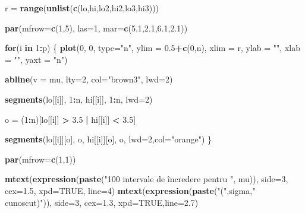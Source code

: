 \documentclass[]{article}
\newenvironment{Shaded}{\begin{snugshade}}{\end{snugshade}}
\newcommand{\KeywordTok}[1]{\textcolor[rgb]{0.13,0.29,0.53}{\textbf{#1}}}
\newcommand{\DataTypeTok}[1]{\textcolor[rgb]{0.13,0.29,0.53}{#1}}
\newcommand{\DecValTok}[1]{\textcolor[rgb]{0.00,0.00,0.81}{#1}}
\newcommand{\FloatTok}[1]{\textcolor[rgb]{0.00,0.00,0.81}{#1}}
\newcommand{\StringTok}[1]{\textcolor[rgb]{0.31,0.60,0.02}{#1}}
\newcommand{\OtherTok}[1]{\textcolor[rgb]{0.56,0.35,0.01}{#1}}
\newcommand{\ControlFlowTok}[1]{\textcolor[rgb]{0.13,0.29,0.53}{\textbf{#1}}}
\newcommand{\OperatorTok}[1]{\textcolor[rgb]{0.81,0.36,0.00}{\textbf{#1}}}
\newcommand{\NormalTok}[1]{#1}
\begin{document}
\begin{Shaded}
\begin{Highlighting}[]
\NormalTok{r =}\StringTok{ }\KeywordTok{range}\NormalTok{(}\KeywordTok{unlist}\NormalTok{(}\KeywordTok{c}\NormalTok{(lo,hi,lo2,hi2,lo3,hi3)))}

\KeywordTok{par}\NormalTok{(}\DataTypeTok{mfrow=}\KeywordTok{c}\NormalTok{(}\DecValTok{1}\NormalTok{,}\DecValTok{5}\NormalTok{), }\DataTypeTok{las=}\DecValTok{1}\NormalTok{, }\DataTypeTok{mar=}\KeywordTok{c}\NormalTok{(}\FloatTok{5.1}\NormalTok{,}\FloatTok{2.1}\NormalTok{,}\FloatTok{6.1}\NormalTok{,}\FloatTok{2.1}\NormalTok{))}

\ControlFlowTok{for}\NormalTok{(i }\ControlFlowTok{in} \DecValTok{1}\OperatorTok{:}\NormalTok{p) \{}
  \KeywordTok{plot}\NormalTok{(}\DecValTok{0}\NormalTok{, }\DecValTok{0}\NormalTok{, }\DataTypeTok{type=}\StringTok{"n"}\NormalTok{, }
       \DataTypeTok{ylim =} \FloatTok{0.5}\OperatorTok{+}\KeywordTok{c}\NormalTok{(}\DecValTok{0}\NormalTok{,n), }
       \DataTypeTok{xlim =}\NormalTok{ r, }
       \DataTypeTok{ylab =} \StringTok{""}\NormalTok{, }
       \DataTypeTok{xlab =} \StringTok{""}\NormalTok{, }
       \DataTypeTok{yaxt =} \StringTok{"n"}\NormalTok{)}
  
  \KeywordTok{abline}\NormalTok{(}\DataTypeTok{v =}\NormalTok{ mu, }\DataTypeTok{lty=}\DecValTok{2}\NormalTok{, }\DataTypeTok{col=}\StringTok{"brown3"}\NormalTok{, }\DataTypeTok{lwd=}\DecValTok{2}\NormalTok{)}
  
  \KeywordTok{segments}\NormalTok{(lo[[i]], }\DecValTok{1}\OperatorTok{:}\NormalTok{n,}
\NormalTok{           hi[[i]], }\DecValTok{1}\OperatorTok{:}\NormalTok{n,}
           \DataTypeTok{lwd=}\DecValTok{2}\NormalTok{)}
  
\NormalTok{  o =}\StringTok{ }\NormalTok{(}\DecValTok{1}\OperatorTok{:}\NormalTok{n)[lo[[i]] }\OperatorTok{>}\StringTok{ }\FloatTok{3.5} \OperatorTok{|}\StringTok{ }\NormalTok{hi[[i]] }\OperatorTok{<}\StringTok{ }\FloatTok{3.5}\NormalTok{]}
  
  \KeywordTok{segments}\NormalTok{(lo[[i]][o], o,}
\NormalTok{           hi[[i]][o], o,}
           \DataTypeTok{lwd=}\DecValTok{2}\NormalTok{,}\DataTypeTok{col=}\StringTok{"orange"}\NormalTok{)}
\NormalTok{\}}

\KeywordTok{par}\NormalTok{(}\DataTypeTok{mfrow=}\KeywordTok{c}\NormalTok{(}\DecValTok{1}\NormalTok{,}\DecValTok{1}\NormalTok{))}

\KeywordTok{mtext}\NormalTok{(}\KeywordTok{expression}\NormalTok{(}\KeywordTok{paste}\NormalTok{(}\StringTok{"100 intervale de încredere pentru "}\NormalTok{, mu)), }
      \DataTypeTok{side=}\DecValTok{3}\NormalTok{, }\DataTypeTok{cex=}\FloatTok{1.5}\NormalTok{, }\DataTypeTok{xpd=}\OtherTok{TRUE}\NormalTok{, }\DataTypeTok{line=}\DecValTok{4}\NormalTok{)}
\KeywordTok{mtext}\NormalTok{(}\KeywordTok{expression}\NormalTok{(}\KeywordTok{paste}\NormalTok{(}\StringTok{"("}\NormalTok{,sigma,}\StringTok{" cunoscut)"}\NormalTok{)), }\DataTypeTok{side=}\DecValTok{3}\NormalTok{, }\DataTypeTok{cex=}\FloatTok{1.3}\NormalTok{, }
      \DataTypeTok{xpd=}\OtherTok{TRUE}\NormalTok{,}\DataTypeTok{line=}\FloatTok{2.7}\NormalTok{)}
\end{Highlighting}
\end{Shaded}
\end{document}

